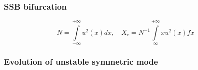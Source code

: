 \documentclass{beamer}
\begin{document}
\begin{frame}
\frametitle{SSB bifurcation}

$$N = \int \limits_{-\infty}^{+\infty} u^2(x) dx, \quad X_c = N^{-1} \int \limits_{\infty}^{+\infty} x u^2(x) fx$$

\begin{figure}
\label{pic:pitchfork}
\end{figure}

\end{frame}


\begin{frame}
\frametitle{Evolution of unstable symmetric mode}

\begin{figure}
\label{pic:evolution}
\end{figure}

\end{frame}
\end{document}
